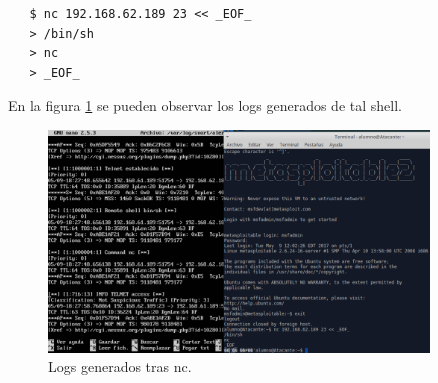 \documentclass[a4,12pt,onecolum]{article}
\begin{document}
\begin{enumerate}
  \begin{verbatim}
   $ nc 192.168.62.189 23 << _EOF_
   > /bin/sh
   > nc
   > _EOF_
  \end{verbatim}

  En la figura \ref{fig:snort9} se pueden observar los logs generados de tal shell.

  \begin{figure}[htbp]
  \centering
  \includegraphics[width=0.9\textwidth]{./images/Snortnc.png}
  \caption{Logs generados tras nc.}
  \label{fig:snort9}
  \end{figure}

\end{enumerate}
\end{document}
